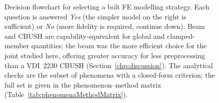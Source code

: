 \begin{figure}[H]
{
}

\caption{
Decision flowchart for selecting a bolt FE modelling strategy.
Each question is answered \emph{Yes}
(the simpler model on the right is sufficient)
or \emph{No}
(more fidelity is required, continue down).
Beam and CBUSH are capability-equivalent for global and
clamped-member quantities; the beam was the more efficient
choice for the joint studied here, offering greater accuracy
for less preprocessing than a VDI~2230 CBUSH
(Section~\ref{chp:discussion}).
The analytical checks are the subset of phenomena with a
closed-form criterion; the full set is given in the
phenomenon--method matrix
(Table~\ref{tab:phenomenaMethodMatrix}).
}
\label{fig:decisionTree}

\end{figure}